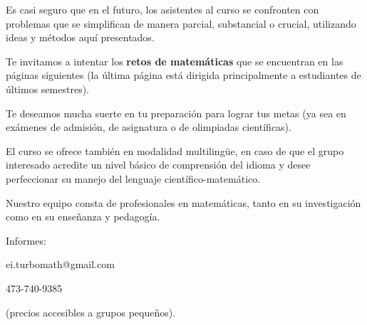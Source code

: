 Es casi seguro que en el futuro, los asistentes al curso se confronten con problemas que se simplifican de manera parcial, substancial o crucial, utilizando ideas y métodos aquí presentados.
\vspace{.5cm}

Te invitamos a intentar los {\bf retos de matemáticas} que se encuentran en las páginas siguientes (la última página está dirigida principalmente a estudiantes de últimos semestres).
\vspace{.5cm}

Te deseamos mucha suerte en tu preparación para lograr tus metas (ya sea en exámenes de admisión, de asignatura o de olimpiadas científicas).
\newpage

El curso se ofrece también en modalidad multilingüe, en caso de que el grupo interesado acredite un nivel básico de comprensión del idioma y desee perfeccionar su manejo del lenguaje científico-matemático.


Nuestro equipo consta de profesionales en matemáticas, tanto en su investigación como en su enseñanza y pedagogía. 
\vspace{.5cm}

\begin{flushright}
Informes: 

ei.turbomath@gmail.com 

473-740-9385

(precios accesibles a grupos pequeños).
\end{flushright}